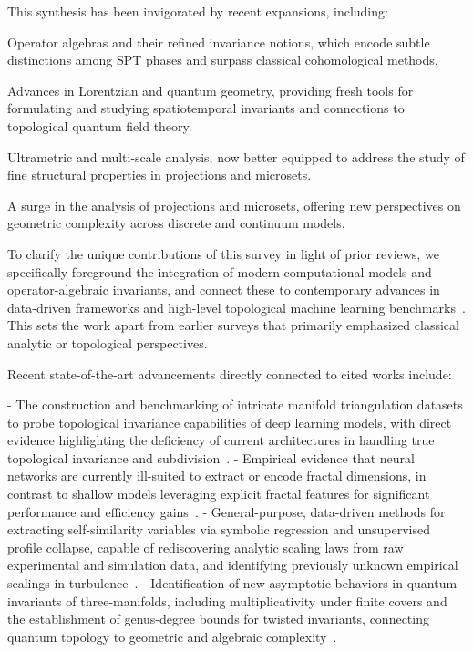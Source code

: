\documentclass[sigconf]{acmart}
\begin{document}
This synthesis has been invigorated by recent expansions, including:

Operator algebras and their refined invariance notions, which encode subtle distinctions among SPT phases and surpass classical cohomological methods.

Advances in Lorentzian and quantum geometry, providing fresh tools for formulating and studying spatiotemporal invariants and connections to topological quantum field theory.

Ultrametric and multi-scale analysis, now better equipped to address the study of fine structural properties in projections and microsets.

A surge in the analysis of projections and microsets, offering new perspectives on geometric complexity across discrete and continuum models.

To clarify the unique contributions of this survey in light of prior reviews, we specifically foreground the integration of modern computational models and operator-algebraic invariants, and connect these to contemporary advances in data-driven frameworks and high-level topological machine learning benchmarks~\cite{ref26, ref39, ref65}. This sets the work apart from earlier surveys that primarily emphasized classical analytic or topological perspectives.

Recent state-of-the-art advancements directly connected to cited works include:

- The construction and benchmarking of intricate manifold triangulation datasets to probe topological invariance capabilities of deep learning models, with direct evidence highlighting the deficiency of current architectures in handling true topological invariance and subdivision~\cite{ref26}.
- Empirical evidence that neural networks are currently ill-suited to extract or encode fractal dimensions, in contrast to shallow models leveraging explicit fractal features for significant performance and efficiency gains~\cite{ref39}.
- General-purpose, data-driven methods for extracting self-similarity variables via symbolic regression and unsupervised profile collapse, capable of rediscovering analytic scaling laws from raw experimental and simulation data, and identifying previously unknown empirical scalings in turbulence~\cite{ref65}.
- Identification of new asymptotic behaviors in quantum invariants of three-manifolds, including multiplicativity under finite covers and the establishment of genus-degree bounds for twisted invariants, connecting quantum topology to geometric and algebraic complexity~\cite{ref87, ref89, ref90}.
\end{document}
